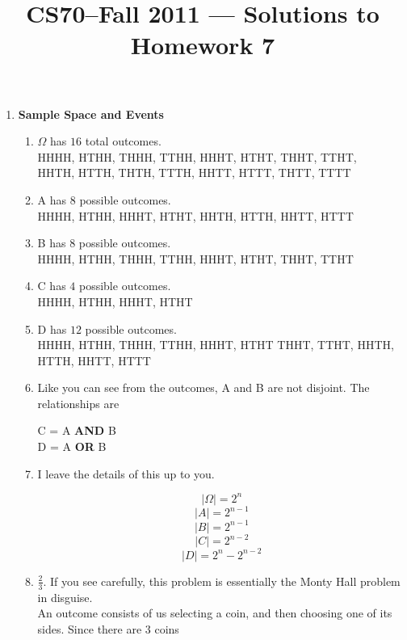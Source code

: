 \documentclass[11pt]{article}
\title{CS70--Fall 2011 --- Solutions to Homework 7}
\date{}
\begin{document}
	\maketitle

	\begin{enumerate}
		
		\item \textbf{Sample Space and Events}
			
			\begin{enumerate}
				\item $\Omega$ has $16$ total outcomes. \\ 
				HHHH, HTHH, THHH, TTHH,	HHHT, HTHT, THHT, TTHT, \\
				HHTH, HTTH, THTH, TTTH, HHTT, HTTT, THTT, TTTT
				\item A has $8$ possible outcomes. \\
				HHHH, HTHH, HHHT, HTHT, HHTH, HTTH, HHTT, HTTT
				\item B has $8$ possible outcomes. \\
				HHHH, HTHH, THHH, TTHH, HHHT, HTHT, THHT, TTHT
				\item C has $4$ possible outcomes. \\
				HHHH, HTHH, HHHT, HTHT
				\item D has $12$ possible outcomes. \\
				HHHH, HTHH, THHH, TTHH, HHHT, HTHT 
				THHT, TTHT, HHTH, HTTH, HHTT, HTTT
				\item Like you can see from the outcomes, A and B are not disjoint. The relationships are \\
					\begin{center}
						C = A \textbf{AND} B \\
						D = A \textbf{OR} B
					\end{center}
				\item I leave the details of this up to you. 
					\begin{center}
						$$\vert \Omega \vert = 2^n$$
						$$\vert A \vert = 2^{n-1}$$
						$$\vert B \vert = 2^{n-1}$$
						$$\vert C \vert = 2^{n-2}$$
						$$\vert D \vert = 2^n - 2^{n-2}$$
					\end{center} 
				\item $\frac{2}{3}$. If you see carefully, this problem is essentially the Monty Hall problem in disguise. \\
				An outcome consists of us selecting a coin, and then choosing one of its sides. Since there are $3$ coins

\end{enumerate}
\end{enumerate}
\end{document}

